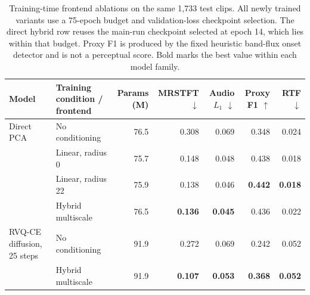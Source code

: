 \begin{table}[t]
\centering
\small
\setlength{\tabcolsep}{5pt}
\begin{tabular}{llrrrrr}
\toprule
Model & Training condition / frontend & Params (M) & MRSTFT $\downarrow$ & Audio $L_1$ $\downarrow$ & Proxy F1 $\uparrow$ & RTF $\downarrow$ \\
\midrule
Direct PCA & No conditioning & 76.5 & 0.308 & 0.069 & 0.348 & 0.024 \\
 & Linear, radius 0 & 75.7 & 0.148 & 0.048 & 0.438 & 0.018 \\
 & Linear, radius 22 & 75.9 & 0.138 & 0.046 & \textbf{0.442} & \textbf{0.018} \\
 & Hybrid multiscale & 76.5 & \textbf{0.136} & \textbf{0.045} & 0.436 & 0.022 \\
\midrule
RVQ-CE diffusion, 25 steps & No conditioning & 91.9 & 0.272 & 0.069 & 0.242 & 0.052 \\
 & Hybrid multiscale & 91.9 & \textbf{0.107} & \textbf{0.053} & \textbf{0.368} & \textbf{0.052} \\
\bottomrule
\end{tabular}
\caption{Training-time frontend ablations on the same 1,733 test clips. All newly trained variants use a 75-epoch budget and validation-loss checkpoint selection. The direct hybrid row reuses the main-run checkpoint selected at epoch 14, which lies within that budget. Proxy F1 is produced by the fixed heuristic band-flux onset detector and is not a perceptual score. Bold marks the best value within each model family.}
\label{tab:frontend_training_ablation}
\end{table}
